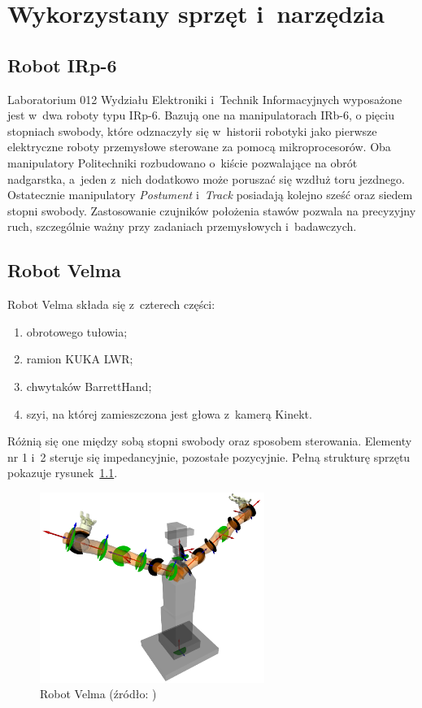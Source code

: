 
\chapter{Wykorzystany sprzęt i~narzędzia}
\label{ch:sprzęt_i_narzędzia}

	\section{Robot IRp-6}
	\label{s:robot_irp6}
	Laboratorium 012 Wydziału Elektroniki i~Technik Informacyjnych wyposażone jest w~dwa roboty typu IRp-6. Bazują one na manipulatorach IRb-6, o pięciu stopniach swobody\cite{merapiap}, które odznaczyły się w~historii robotyki jako pierwsze elektryczne roboty przemysłowe sterowane za pomocą mikroprocesorów\cite{ABB}. Oba manipulatory Politechniki rozbudowano o~kiście pozwalające na obrót nadgarstka, a~jeden z~nich dodatkowo może poruszać się wzdłuż toru jezdnego. Ostatecznie manipulatory \textit{Postument} i~\textit{Track} posiadają kolejno sześć oraz siedem stopni swobody\cite{IRPOS}. Zastosowanie czujników położenia stawów pozwala na precyzyjny ruch, szczególnie ważny przy zadaniach przemysłowych i~badawczych. 
	\section{Robot Velma}
	\label{s:robot_velma}
	Robot Velma składa się z~czterech części:
	\begin{enumerate}
		\item obrotowego tułowia;
		\item ramion KUKA LWR;
		\item chwytaków BarrettHand;
		\item szyi, na której zamieszczona jest głowa z~kamerą Kinekt.
	\end{enumerate}
	Różnią się one między sobą stopni swobody oraz sposobem sterowania. Elementy nr 1 i~2 steruje się impedancyjnie, pozostałe pozycyjnie\cite{robotVelma}. Pełną strukturę sprzętu pokazuje rysunek~\ref{f:robot_Velma}.
	
	\begin{figure}[h]
		\centering
		\includegraphics[width=0.65\textwidth]{obrazy/velma_joints.png}
		\caption{Robot Velma (źródło: \cite{robotVelma})}
		\label{f:robot_Velma}
	\end{figure}
	
